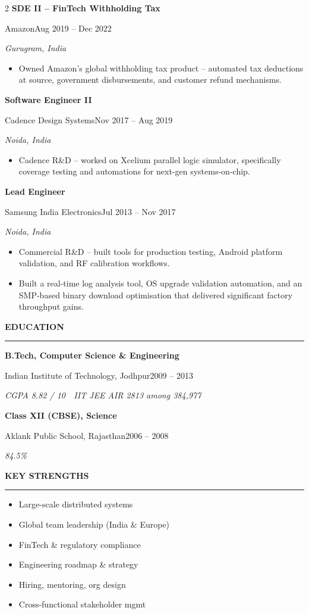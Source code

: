 \documentclass[9pt,a4paper]{extarticle}
\newcommand{\cvsection}[1]{%
  \vspace{4pt}%
  {\small\bfseries\color{textdark}\MakeUppercase{#1}}\par
  \vspace{0pt}%
  {\color{accent}\rule{\linewidth}{0.8pt}}\par
  \vspace{2pt}%
}
\newcommand{\role}[4]{%
  {\bfseries\color{textdark}#1}\par
  {\color{accent}\footnotesize #2}\hfill{\color{textmuted}\footnotesize #4}\par
  {\color{textlight}\footnotesize\itshape #3}\par\vspace{1pt}
}
\newcommand{\edublock}[4]{%
  {\bfseries\color{textdark}#1}\par
  {\color{accent}\footnotesize #2}\hfill{\color{textmuted}\footnotesize #4}\par
  {\color{textlight}\footnotesize\itshape #3}\par\vspace{1pt}
}
\begin{document}
\begin{paracol}{2}
\role{SDE II -- FinTech Withholding Tax}{Amazon}{Gurugram, India}{Aug 2019 -- Dec 2022}
\footnotesize
\begin{itemize}
  \item Owned Amazon's global withholding tax product -- automated tax deductions
        at source, government disbursements, and customer refund mechanisms.
\end{itemize}

\role{Software Engineer II}{Cadence Design Systems}{Noida, India}{Nov 2017 -- Aug 2019}
\footnotesize
\begin{itemize}
  \item Cadence R\&D -- worked on Xcelium parallel logic simulator, specifically
        coverage testing and automations for next-gen systems-on-chip.
\end{itemize}

\role{Lead Engineer}{Samsung India Electronics}{Noida, India}{Jul 2013 -- Nov 2017}
\footnotesize
\begin{itemize}
  \item Commercial R\&D -- built tools for production testing, Android platform
        validation, and RF calibration workflows.
  \item Built a real-time log analysis tool, OS upgrade validation automation, and
        an SMP-based binary download optimisation that delivered significant factory
        throughput gains.
\end{itemize}

\cvsection{Education}
\edublock{B.Tech, Computer Science \& Engineering}{Indian Institute of Technology, Jodhpur}{CGPA 8.82 / 10~\textperiodcentered~IIT JEE AIR 2813 among 384{,}977}{2009 -- 2013}
\edublock{Class XII (CBSE), Science}{Aklank Public School, Rajasthan}{84.5\%}{2006 -- 2008}

\switchcolumn
\cvsection{Key Strengths}
\footnotesize
\begin{itemize}
  \item Large-scale distributed systems
  \item Global team leadership (India \& Europe)
  \item FinTech \& regulatory compliance
  \item Engineering roadmap \& strategy
  \item Hiring, mentoring, org design
  \item Cross-functional stakeholder mgmt
\end{itemize}


\end{paracol}
\end{document}
